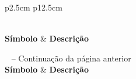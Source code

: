 
\begin{longtable}{p{2.5cm} p{12.5cm}} %
    \caption[Lista de Símbolos Matemáticos e Notações]{Lista dos principais símbolos matemáticos e notações utilizados na dissertação e suas respectivas descrições. Esta tabela continua na próxima página.} \label{tab:lista_de_simbolos} \\ 

    \toprule
    \textbf{Símbolo} & \textbf{Descrição} \\
    \midrule
    \endfirsthead

    {{\tablename\ \thetable{} -- Continuação da página anterior}} \\
    \toprule
    \textbf{Símbolo} & \textbf{Descrição} \\
    \midrule
    \endhead

    \midrule
     \\
    \endfoot

    \bottomrule
    \endlastfoot


\end{longtable}
